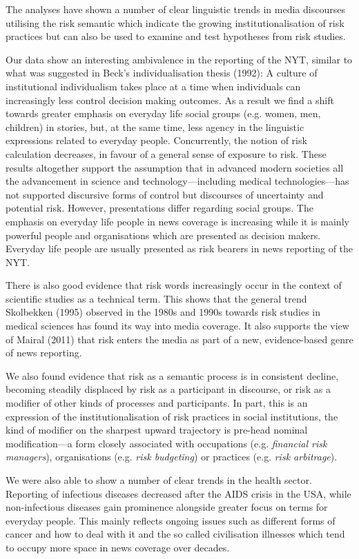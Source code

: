 The analyses have shown a number of clear linguistic trends in media discourses utilising the risk semantic which indicate the growing institutionalisation of risk practices but can also be used to examine and test hypotheses from risk studies. 

Our data show an interesting ambivalence in the reporting of the NYT, similar to what was suggested in Beck's individualisation thesis (1992): A culture of institutional individualism takes place at a time when individuals can increasingly less control decision making outcomes. As a result we find a shift towards greater emphasis on everyday life social groups (e.g. women, men, children) in stories, but, at the same time, less agency in the linguistic expressions related to everyday people. Concurrently, the notion of risk calculation decreases, in favour of a general sense of exposure to risk. These results altogether support the assumption that in advanced modern societies all the advancement in science and technology---including medical technologies---has not supported discursive forms of control but discourses of uncertainty and potential risk. However, presentations differ regarding social groups. The emphasis on everyday life people in news coverage is increasing while it is mainly powerful people and organisations which are presented as decision makers. Everyday life people are usually presented as risk bearers in news reporting of the NYT.

There is also good evidence that risk words increasingly occur in the context of scientific studies as a technical term. This shows that the general trend Skolbekken (1995) observed in the 1980s and 1990s towards risk studies in medical sciences has found its way into media coverage. It also supports the view of Mairal (2011) that risk enters the media as part of a new, evidence-based genre of news reporting. 

We also found evidence that risk as a semantic process is in consistent decline, becoming steadily displaced by risk as a participant in discourse, or risk as a modifier of other kinds of processes and participants. In part, this is an expression of the institutionalisation of risk practices in social institutions, the kind of modifier on the sharpest upward trajectory is pre-head nominal modification---a form closely associated with occupations (e.g. \emph{financial risk managers}), organisations (e.g. \emph{risk budgeting}) or practices (e.g. \emph{risk arbitrage}). 

We were also able to show a number of clear trends in the health sector. Reporting of infectious diseases decreased after the AIDS crisis in the USA, while non-infectious diseases gain prominence alongside greater focus on terms for everyday people. This mainly reflects ongoing issues such as different forms of cancer and how to deal with it and the so called civilisation illnesses which tend to occupy more space in news coverage over decades.

